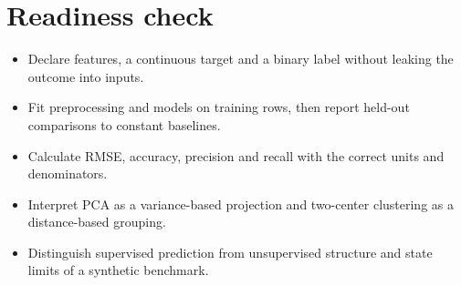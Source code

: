 \documentclass[11pt,letterpaper]{article}
\theoremstyle{definition}\newtheorem{definition}{Definition}\newtheorem{example}{Example}
\numberwithin{equation}{section}
\begin{document}
\section*{Readiness check}
\begin{itemize}
\item Declare features, a continuous target and a binary label without leaking the outcome into inputs.
\item Fit preprocessing and models on training rows, then report held-out comparisons to constant baselines.
\item Calculate RMSE, accuracy, precision and recall with the correct units and denominators.
\item Interpret PCA as a variance-based projection and two-center clustering as a distance-based grouping.
\item Distinguish supervised prediction from unsupervised structure and state limits of a synthetic benchmark.
\end{itemize}
\end{document}
